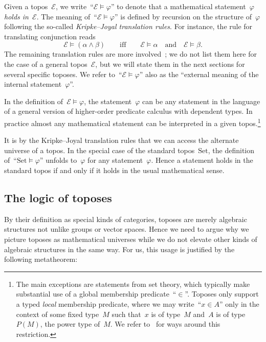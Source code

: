 \documentclass[oneside,reqno]{amsart}
\theoremstyle{definition}
\theoremstyle{plain}
\theoremstyle{remark}
\newtheorem{rem}[defn]{Remark}
\newcommand{\E}{\mathcal{E}}
\newcommand{\Set}{\mathrm{Set}}
\renewcommand{\_}{\mathpunct{.}\,}
\newcommand{\?}{\,{:}\,}
\begin{document}
Given a topos~$\E$, we write~``$\E \models \varphi$'' to denote that a
mathematical statement~$\varphi$ \emph{holds in~$\E$}. The meaning of~``$\E \models
\varphi$'' is defined by recursion on the structure of~$\varphi$ following the
so-called \emph{Kripke--Joyal translation rules}. For instance, the rule for
translating conjunction reads
\[ \E \models (\alpha \wedge \beta) \qquad\text{iff}\qquad
  \E \models \alpha \quad\text{and}\quad \E \models \beta. \]
The remaining translation rules are more
involved~\cite[Section~VI.7]{moerdijk-maclane:sheaves-logic}; we do not list them here for
the case of a general topos~$\E$, but we will state them in the next sections
for several specific toposes. We refer to~``$\E \models \varphi$'' also as the
``external meaning of the internal statement~$\varphi$''.

In the definition of~$\E \models \varphi$, the statement~$\varphi$ can be any
statement in the language of a general version of higher-order predicate
calculus with dependent types. In practice almost any mathematical statement
can be interpreted in a given topos.\footnote{The main exceptions are
statements from set theory, which typically make substantial use of a global
membership predicate~``$\in$''. Toposes only support a typed \emph{local}
membership predicate, where we may write~``$x \in A$'' only in the context of
some fixed type~$M$ such that~$x$ is of type~$M$ and~$A$ is of
type~$P(M)$, the power type of~$M$. We refer
to~\cite{fourman:sheaf-models,streicher:forcizf,awodey-butz-simpson-streicher:bist}
for ways around this restriction.}

It is by the Kripke--Joyal translation rules that we can access the alternate
universe of a topos. In the special case of the standard topos~$\Set$, the
definition of~``$\Set \models \varphi$'' unfolds to~$\varphi$ for any
statement~$\varphi$. Hence a statement holds in the standard topos if and only
if it holds in the usual mathematical sense.



\subsection{The logic of toposes}\label{sect:logic-of-toposes}
By their definition as special kinds of
categories, toposes are merely algebraic structures not unlike groups or vector
spaces. Hence we need to argue why we picture toposes as mathematical universes
while we do not elevate other kinds of algebraic structures in the same way.
For us, this usage is justified by the following metatheorem:
\end{document}
